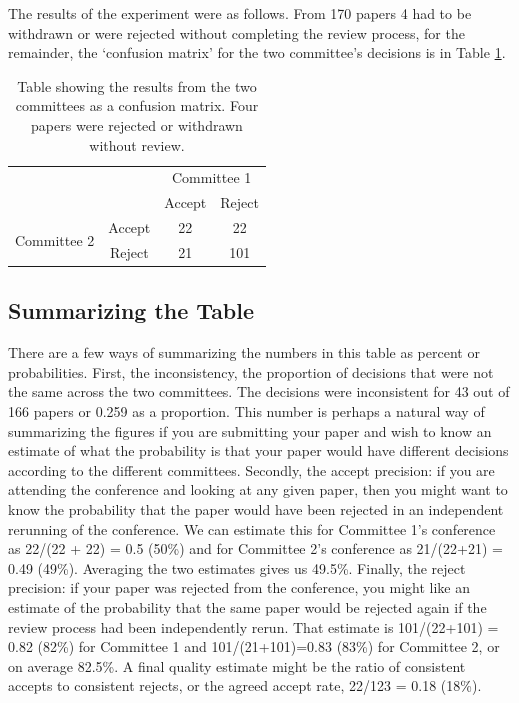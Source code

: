 \begin{flushright}
\end{flushright}

The results of the experiment were as follows. From 170 papers 4 had to
be withdrawn or were rejected without completing the review process, for
the remainder, the `confusion matrix' for the two committee's decisions
is in Table \ref{table-neurips-experiment-results}.

\begin{table}[htb]
\caption{Table showing the results from the two committees as a confusion matrix. Four papers were rejected or withdrawn without review.}
\label{table-neurips-experiment-results}


\begin{tabular}{lc|c|c|}
& & \multicolumn{2}{c}{Committee 1} \\
& & Accept & Reject \\
\multirow{2}{*}{Committee 2} & Accept & 22 & 22  \\ \hline
& Reject & 21 & 101 
\end{tabular}
\end{table}

\hypertarget{summarizing-the-table}{%
\subsection{Summarizing the Table}\label{summarizing-the-table}}

There are a few ways of summarizing the numbers in this table as percent
or probabilities. First, the inconsistency, the proportion of decisions
that were not the same across the two committees. The decisions were
inconsistent for 43 out of 166 papers or 0.259 as a proportion. This
number is perhaps a natural way of summarizing the figures if you are
submitting your paper and wish to know an estimate of what the
probability is that your paper would have different decisions according
to the different committees. Secondly, the accept precision: if you are
attending the conference and looking at any given paper, then you might
want to know the probability that the paper would have been rejected in
an independent rerunning of the conference. We can estimate this for
Committee 1's conference as 22/(22 + 22) = 0.5 (50\%) and for Committee
2's conference as 21/(22+21) = 0.49 (49\%). Averaging the two estimates
gives us 49.5\%. Finally, the reject precision: if your paper was
rejected from the conference, you might like an estimate of the
probability that the same paper would be rejected again if the review
process had been independently rerun. That estimate is 101/(22+101) =
0.82 (82\%) for Committee 1 and 101/(21+101)=0.83 (83\%) for Committee
2, or on average 82.5\%. A final quality estimate might be the ratio of
consistent accepts to consistent rejects, or the agreed accept rate,
22/123 = 0.18 (18\%).

